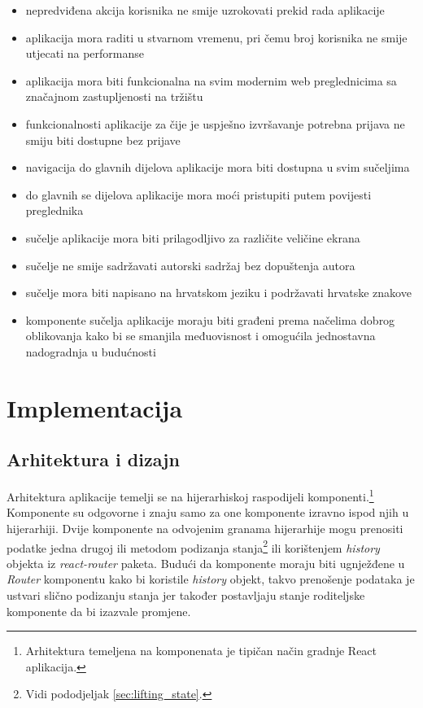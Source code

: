 \documentclass[times, utf8, zavrsni, numeric]{fer}
\newcommand{\razmaks}{\vspace{10pt}}
\begin{document}
\razmaks
\begin{itemize}
  \item nepredviđena akcija korisnika ne smije uzrokovati prekid rada aplikacije
  \item aplikacija mora raditi u stvarnom vremenu, pri čemu broj korisnika ne smije utjecati na performanse
  \item aplikacija mora biti funkcionalna na svim modernim web preglednicima sa značajnom zastupljenosti na tržištu
  \item funkcionalnosti aplikacije za čije je uspješno izvršavanje potrebna prijava ne smiju biti dostupne bez prijave
  \item navigacija do glavnih dijelova aplikacije mora biti dostupna u svim sučeljima
  \item do glavnih se dijelova aplikacije mora moći pristupiti putem povijesti preglednika
  \item sučelje aplikacije mora biti prilagodljivo za različite veličine ekrana
  \item sučelje ne smije sadržavati autorski sadržaj bez dopuštenja autora
  \item sučelje mora biti napisano na hrvatskom jeziku i podržavati hrvatske znakove
  \item komponente sučelja aplikacije moraju biti građeni prema načelima dobrog oblikovanja kako bi se smanjila međuovisnost i omogućila jednostavna nadogradnja u budućnosti
\end{itemize}


\chapter{Implementacija}


\section{Arhitektura i dizajn}

Arhitektura aplikacije temelji se na hijerarhiskoj raspodijeli komponenti.\footnote{Arhitektura temeljena na komponenata  je tipičan način gradnje React aplikacija\citep{understandingCBA}.}
Komponente su odgovorne i znaju samo za one komponente izravno ispod njih u hijerarhiji.
Dvije komponente na odvojenim granama hijerarhije mogu prenositi podatke jedna drugoj ili metodom podizanja stanja\footnote{Vidi pododjeljak \ref{sec:lifting_state}.} ili korištenjem \emph{history} objekta iz \emph{react-router} paketa.
Budući da komponente moraju biti ugnježđene u \emph{Router} komponentu kako bi koristile \emph{history} objekt, takvo prenošenje podataka je ustvari slično podizanju stanja jer također postavljaju stanje roditeljske komponente da bi izazvale promjene. 
\end{document}
